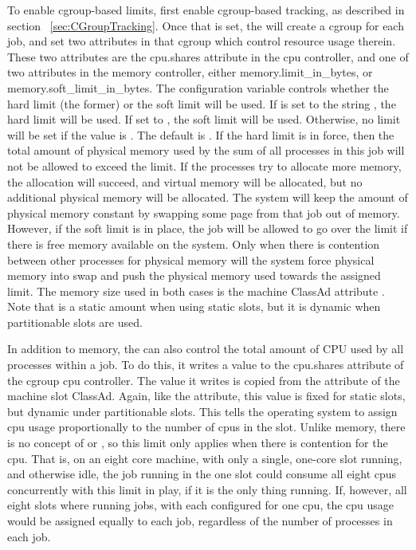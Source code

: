 To enable cgroup-based limits, first enable cgroup-based tracking, as
described in section ~\ref{sec:CGroupTracking}.  
Once that is set,
the  will create a cgroup for each job, and set two
attributes in that cgroup which control resource usage therein.  
These
two attributes are the cpu.shares attribute in the cpu controller, and one
of two attributes in the memory controller, either memory.limit\_in\_bytes, or 
memory.soft\_limit\_in\_bytes.  
The configuration variable  controls
whether the hard limit (the former) or the soft limit will be used.  
If  is set to the string , 
the hard limit will be used.
If set to , the soft limit will be used.  
Otherwise, no limit will be set if the value is .
The default is .
If the hard limit is in force, then the total amount of physical memory
used by the sum of all processes in this job will not be allowed to exceed
the limit.  
If the processes try to allocate more memory, the allocation will
succeed, and virtual memory will be allocated, 
but no additional physical memory will be allocated.
The system will keep the amount of physical memory constant by swapping some
page from that job out of memory.  
However, if the soft limit is in place,
the job will be allowed to go over the limit if there is free memory 
available on the system.  
Only when there is contention between other processes for physical memory
will the system force physical memory into swap and push
the physical memory used towards the assigned limit.
The memory size used in both cases is the machine ClassAd attribute
.
Note that  is 
a static amount when using static slots, but it is dynamic when partitionable 
slots are used.

In addition to memory, the  can also control 
the total amount of CPU used by all processes within a job.
To do this, it writes a value
to the cpu.shares attribute of the cgroup cpu controller.  
The value it writes is copied from the  attribute 
of the machine slot ClassAd.
Again, like the  attribute, this value is fixed for static slots,
but dynamic under partitionable slots.  
This tells the operating system
to assign cpu usage proportionally to the number of cpus in the slot.  
Unlike memory, 
there is no concept of  or , 
so this limit only applies when there is contention for the cpu.
That is, on an eight core machine, with
only a single, one-core slot running, and otherwise idle, the job running
in the one slot could consume all eight cpus concurrently with this limit
in play, if it is the only thing running.  
If, however, all eight slots where running jobs, 
with each configured for one cpu, the cpu usage would be assigned
equally to each job, regardless of the number of processes in each job.

